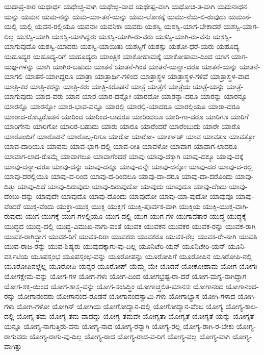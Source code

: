 {ಯಥಾಪ್ರ-ಕಾರ
ಯಥಾರ್ಥ
ಯಥೇಚ್ಛ-ವಾಗಿ
ಯಥೇಚ್ಛ-ವಾದ
ಯಥೇಷ್ಟ-ವಾಗಿ
ಯಥೋಚಿ-ತ-ವಾಗಿ
ಯದುನಾಥನ
ಯನ್ನು
ಯಮನ
ಯಮ-ನನ್ನು
ಯಮ-ಯಾ-ತನೆ-ಯನ್ನು
ಯಮ-ಲೋಕಕ್ಕೆ
ಯಮು-ನೆಯ-ಲಿ-ರುವುದು
ಯಮುನೆ-ಯಲ್ಲಿ
ಯಲ್ಲಿ
ಯವನ-ರಲ್ಲಿಯೂ
ಯವನಾಃ
ಯವನಿಕಾ
ಯವರು
ಯಶಸ್ವಿ
ಯಶಸ್ವಿ-ಯಾಗ-ಬೇಕಾದರೆ
ಯಶಸ್ವಿ-ಯಾಗ-ಲಿಲ್ಲ
ಯಶಸ್ವಿ-ಯಾಗಿ
ಯಶಸ್ವಿ-ಯಾಗಿದ್ದರು
ಯಶಸ್ವಿ-ಯಾಗಿ-ರು-ವರು
ಯಶಸ್ವಿ-ಯಾಗಿ-ರು-ವೆನು
ಯಶಸ್ವಿ-ಯಾಗುವುದೊ
ಯಶಸ್ವಿ-ಯಾದರು
ಯಶಸ್ವಿ-ಯಾಯಿತು
ಯಶಸ್ಸಿಗೆ
ಯಶಸ್ಸು
ಯಶೋ-ಧರೆ-ಯರು
ಯಹೂದ್ಯ
ಯಹೂದ್ಯರ
ಯಹೂದ್ಯ-ರಿಗೆ
ಯಹೂದ್ಯರು
ಯಾಂತ್ರಿಕ
ಯಾಕೋಹಾಮಕ್ಕೆ
ಯಾಕೋಹಾಮ-ದಿಂದ
ಯಾಗ
ಯಾಗ-ಯಜ್ಞ-ಗಳನ್ನು
ಯಾಗಿ
ಯಾಗಿರ-ಬಹುದು
ಯಾತನೆ
ಯಾತನೆ-ಗಿಂತ
ಯಾತನೆ-ಯನ್ನಾ-ದರೂ
ಯಾತನೆ-ಯನ್ನು
ಯಾತನೆ-ಯಾಗಲಿ
ಯಾತನೆ-ಯಾಗಿದ್ದರೂ
ಯಾತ್ರಾ
ಯಾತ್ರಾರ್ಥಿ-ಗಳಿಂದ
ಯಾತ್ರಾಸ್ಥಳ
ಯಾತ್ರಾಸ್ಥಳ-ಗಳಿವೆ
ಯಾತ್ರಾಸ್ಥಳ-ವಾದ
ಯಾತ್ರಿ-ಕರ
ಯಾತ್ರಿ-ಕರನ್ನು
ಯಾತ್ರಿ-ಕರು
ಯಾತ್ರಿ-ಕರೊಡನೆ
ಯಾತ್ರೆ
ಯಾತ್ರೆಗೆ
ಯಾತ್ರೆಯ
ಯಾತ್ರೆ-ಯನ್ನು
ಯಾತ್ರೆ-ಯಾಗುವುದು
ಯಾದ-ವರು
ಯಾನ
ಯಾರ
ಯಾರ-ದನ್ನೋ
ಯಾರದೋ
ಯಾರನ್ನಾ-ದರೂ
ಯಾರನ್ನು
ಯಾರನ್ನೂ
ಯಾರನ್ನೊ
ಯಾರನ್ನೋ
ಯಾರ-ಭಾವ-ವನ್ನೂ
ಯಾರಲ್ಲಿ
ಯಾರಲ್ಲಿ-ಯಾದರೂ
ಯಾರಲ್ಲಿಯೂ
ಯಾರಾ-ದರೂ
ಯಾರಾದ-ರೊಬ್ಬರೊಡನೆ
ಯಾರಿಂದ
ಯಾರಿಂದ-ಲಾದರೂ
ಯಾರಿಂದಲೂ
ಯಾರಿ-ಗಾ-ದರೂ
ಯಾರಿಗೂ
ಯಾರಿಗೆ
ಯಾರಿಗೇನು
ಯಾರಿಗೋ
ಯಾರಿರ-ಬಹುದು
ಯಾರು
ಯಾರೂ
ಯಾರೆಂದರೆ
ಯಾರೆಂಬುದು
ಯಾರೇ
ಯಾರೊ
ಯಾರೊಂದಿಗೆ
ಯಾರೊಡನೆ
ಯಾರೊಬ್ಬ-ರಿಗೂ
ಯಾರೋ
ಯಾರೋ-
ಯಾರ್ಕಾಡ್
ಯಾವ
ಯಾವತ್ತೂ
ಯಾವತ್ತೋ
ಯಾವ-ದಾರಿಯೂ
ಯಾವನು
ಯಾವ-ಭಾಗ-ದಲ್ಲಿ
ಯಾವ-ರೀತಿ
ಯಾವಳೋ
ಯಾವಾಗ
ಯಾವಾಗ-ಲಾದರೂ
ಯಾವಾಗ-ಲಾದ-ರೊಮ್ಮೆ
ಯಾವಾಗಲೂ
ಯಾವಾಗೆಂದರೆ
ಯಾವು
ಯಾವು-ದಕ್ಕಾಗಿ
ಯಾವು-ದಕ್ಕೂ
ಯಾವು-ದಕ್ಕೆ
ಯಾವು-ದನ್ನಾ-ದರೂ
ಯಾವು-ದನ್ನು
ಯಾವು-ದನ್ನೂ
ಯಾವು-ದನ್ನೇ
ಯಾವು-ದನ್ನೋ
ಯಾವು-ದರ
ಯಾವು-ದ-ರಲ್ಲಿ
ಯಾವು-ದರಲ್ಲಿಯೂ
ಯಾವು-ದ-ರಿಂದ
ಯಾವು-ದ-ರಿಂದಲೂ
ಯಾವು-ದಾ-ದರೂ
ಯಾವು-ದಾ-ದರೊಂದು
ಯಾವು-ದಿತ್ತು
ಯಾವು-ದಿದೆ
ಯಾವು-ದಿರುವುದು
ಯಾವು-ದಿರುವುದೋ
ಯಾವುದು
ಯಾವುದೂ
ಯಾವು-ದೆಂದು
ಯಾವು-ದೆಂಬು-ದನ್ನು
ಯಾವುದೇ
ಯಾವುದೊ
ಯಾವು-ದೊಂದು
ಯಾವುದೋ
ಯಾವು-ಯಾ-ವುದೋ
ಯಾವುವೂ
ಯಾವು-ವೆಂದರೆ
ಯುಕ್ತ-ವೆಂದು
ಯುಕ್ತಾ-ಯುಕ್ತ
ಯುಕ್ತಿ
ಯುಕ್ತಿಗೆ
ಯುಕ್ತಿ-ಪೂರ್ವಕ-ವಾಗಿ
ಯುಕ್ತಿಯ
ಯುಕ್ತಿ-ಯುಕ್ತ-ವಾಗಿ-ರುವುದು
ಯುಗ
ಯುಗಕ್ಕೆ
ಯುಗ-ಗಳಲ್ಲಿಯೂ
ಯುಗ-ದಲ್ಲಿ
ಯುಗ-ಯುಗ-ಗಳ
ಯುಗಾವತಾರ
ಯುದ್ಧ
ಯುದ್ಧಕ್ಕೆ
ಯುದ್ಧದ
ಯುದ್ಧ-ದಲ್ಲಿ
ಯುದ್ಧ-ವಿಮುಖ-ನಾಗು-ವಂತೆ
ಯುವಕ
ಯುವಕನ
ಯುವಕರ
ಯುವಕ-ರನ್ನು
ಯುವಕ-ರಾಗಿ
ಯುವಕ-ರಾಗಿದ್ದಾಗ
ಯುವಕ-ರಿಗೆ
ಯುವಕ-ರಿರಾ
ಯುವಕರು
ಯುವಕರೂ
ಯುವಕ-ರೆಲ್ಲ
ಯುವಕ-ರೇ-ನಾಗಿ
ಯುವತಿ
ಯುವ-ರಾಜ-ರನ್ನು
ಯುವ-ಶಿಷ್ಯರು
ಯುವುದಕ್ಕಾಗು-ವು-ದಿಲ್ಲ
ಯೂನಿಟೆರಿ-ಯನ್
ಯೂನಿಟೇರಿ-ಯನ್
ಯೂನಿ-ವರ್ಸಿಟಿಯ
ಯೂಪಸ್ತಂಭ
ಯೂಪಸ್ತಂಭ-ವನ್ನು
ಯೂರೋಪನ್ನು
ಯೂರೋಪಿಗೆ
ಯೂರೋಪಿನ
ಯೂರೋಪಿ-ನಲ್ಲಿ
ಯೂರೋಪಿನಲ್ಲೆಲ್ಲ
ಯೂರೋಪಿ-ಯನ್ನರ
ಯೂರೋಪ್
ಯೆಮ್ಮ
ಯೇ
ಯೊಡನೆ
ಯೋಕೋಹಾಮ
ಯೋಗ
ಯೋಗಃ
ಯೋಗಕ್ಷೇಮ-ವನ್ನು
ಯೋಗ-ಗಳ
ಯೋಗ-ಗಳು
ಯೋಗ-ದಿಂದ
ಯೋಗಭ್ರಷ್ಟ-ರಾ-ದರೆ
ಯೋಗ-ಮಗ್ನ-ನಾಗಿದ್ದಾಗ
ಯೋಗ-ಶಕ್ತಿ-ಯಿಂದ
ಯೋಗ-ಶಾಸ್ತ್ರ-ವನ್ನು
ಯೋಗ-ಸಂಸಿದ್ಧಿಂ
ಯೋಗಾಚ್ಚಲಿತ-ಮಾನಸಃ
ಯೋಗಾನಂದ
ಯೋಗಾನಂದ-ರನ್ನು
ಯೋಗಾನಂದರು
ಯೋಗಾನಂದ-ರೊಡನೆ
ಯೋಗಾನಂದಸ್ವಾಮಿ-ಗಳು
ಯೋಗಾಭ್ಯಾಸ
ಯೋಗಿ-ಗಳಾದ
ಯೋಗಿ-ಗಳು
ಯೋಗಿ-ಗಳೋ
ಯೋಗಿನ್
ಯೋಗಿಯ
ಯೋಗೋದ್ಯಾನ-ದಲ್ಲಿ
ಯೋಗೋದ್ಯಾನ-ವೆಂಬ
ಯೋಗ್ಯ
ಯೋಗ್ಯ-ಕಾಲ-ದಲ್ಲಿ
ಯೋಗ್ಯ-ತಮ
ಯೋಗ್ಯ-ತಮ-ವಾದದ್ದು
ಯೋಗ್ಯ-ತಮವೇ
ಯೋಗ್ಯತಾ
ಯೋಗ್ಯತೆ
ಯೋಗ್ಯತೆ-ಯನ್ನು
ಯೋಗ್ಯತೆ-ಯನ್ನೂ
ಯೋಗ್ಯ-ನಾಗುತ್ತಿರು-ವನು
ಯೋಗ್ಯ-ನಾದ
ಯೋಗ್ಯ-ರನ್ನಾಗಿ
ಯೋಗ್ಯ-ರಲ್ಲ
ಯೋಗ್ಯ-ರಾಗಿ-ರ-ಬೇಕು
ಯೋಗ್ಯ-ರಾಗುವರು
ಯೋಗ್ಯ-ರಾಗು-ವು-ದಿಲ್ಲ
ಯೋಗ್ಯ-ರಾದ
ಯೋಗ್ಯ-ರಾದ-ವ-ರಿಗೆ
ಯೋಗ್ಯ-ವಲ್ಲ
ಯೋಗ್ಯ-ವಾಗಿ
ಯೋಗ್ಯ-ವಾಗಿತ್ತು
}
